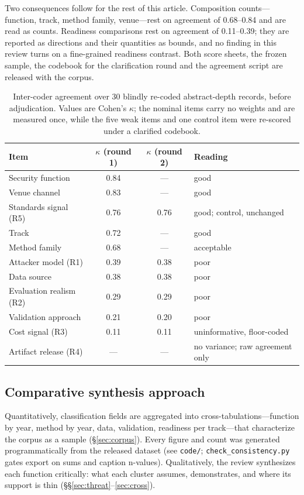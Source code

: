 Two consequences follow for the rest of this article. Composition counts---function, track, method
family, venue---rest on agreement of 0.68--0.84 and are read as counts. Readiness comparisons rest
on agreement of 0.11--0.39; they are reported as directions and their quantities as bounds, and no
finding in this review turns on a fine-grained readiness contrast. Both score sheets, the frozen
sample, the codebook for the clarification round and the agreement script are released with the
corpus.

\begin{table}[tbp]
\centering
\footnotesize
\caption{Inter-coder agreement over 30 blindly re-coded abstract-depth records, before
adjudication. Values are Cohen's $\kappa$; the nominal items carry no weights and are measured
once, while the five weak items and one control item were re-scored under a clarified codebook.}
\label{tab:reliability}
\begin{tabular}{@{}lcc l@{}}
\toprule
Item & $\kappa$ (round 1) & $\kappa$ (round 2) & Reading \\
\midrule
Security function      & 0.84 & ---  & good \\
Venue channel          & 0.83 & ---  & good \\
Standards signal (R5)  & 0.76 & 0.76 & good; control, unchanged \\
Track                  & 0.72 & ---  & good \\
Method family          & 0.68 & ---  & acceptable \\
Attacker model (R1)    & 0.39 & 0.38 & poor \\
Data source            & 0.38 & 0.38 & poor \\
Evaluation realism (R2)& 0.29 & 0.29 & poor \\
Validation approach    & 0.21 & 0.20 & poor \\
Cost signal (R3)       & 0.11 & 0.11 & uninformative, floor-coded \\
Artifact release (R4)  & ---  & ---  & no variance; raw agreement only \\
\bottomrule
\end{tabular}
\end{table}

\subsection{Comparative synthesis approach}
Quantitatively, classification fields are aggregated into cross-tabulations---function by year, method by year, data, validation, readiness per track---that characterize the corpus as a sample (\S\ref{sec:corpus}). Every figure and count was generated programmatically from the released dataset (see \texttt{code/}; \texttt{check\_consistency.py} gates export on sums and caption n-values). Qualitatively, the review synthesizes each function critically: what each cluster assumes, demonstrates, and where its support is thin (\S\S\ref{sec:threat}--\ref{sec:cross}).


